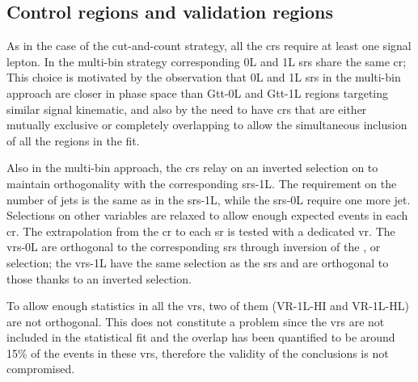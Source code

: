 \subsection*{Control regions and validation regions}

As in the case of the cut-and-count strategy, all the \glspl{cr} require at least one signal lepton. 
In the multi-bin strategy corresponding 0L and 1L \glspl{sr} share the same \gls{cr};
This choice is motivated by the observation that 0L and 1L \glspl{sr} in the multi-bin approach are 
closer in phase space than Gtt-0L and Gtt-1L regions targeting similar signal kinematic, 
and also by the need to have \glspl{cr} that are either mutually exclusive or completely overlapping to 
allow the simultaneous inclusion of all the regions in the fit. 

Also in the multi-bin approach, the \glspl{cr} relay on an inverted selection on \mt to maintain orthogonality with 
the corresponding \glspl{sr}-1L. The requirement on the number of jets is the same as in the \glspl{sr}-1L, while the 
\glspl{sr}-0L require one more jet. Selections on other variables are relaxed to allow enough expected \ttbar events in 
each \gls{cr}.
The extrapolation from the \gls{cr} to each \gls{sr} is tested with a dedicated \gls{vr}. 
The \glspl{vr}-0L are orthogonal to the corresponding \glspl{sr} through inversion of the \mtb, \meff or \met selection;
the \glspl{vr}-1L have the same \mt selection as the \glspl{sr} and are orthogonal to those thanks to
an inverted \mtb selection.

To allow enough statistics in all the \glspl{vr}, two of them (VR-1L-HI and VR-1L-HL) are not orthogonal.
This does not constitute a problem since the \glspl{vr}
are not included in the statistical fit and 
the overlap has been quantified to be around 15\% of the events in these \glspl{vr}, therefore 
the validity of the conclusions is not compromised. 


